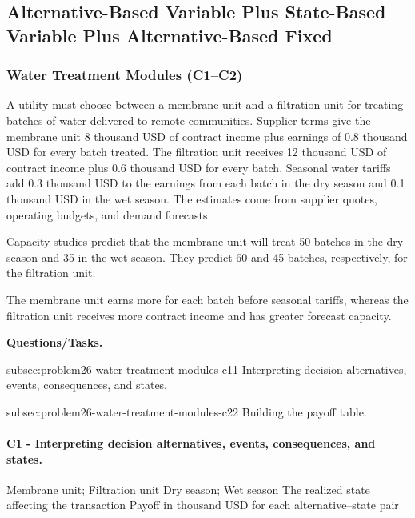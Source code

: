 \subsection{Alternative-Based Variable Plus State-Based Variable Plus Alternative-Based Fixed}
	\label{sec:alternative-based-variable-payoff-plus-state-based-variable-payoff-plus-alternative-based-fixed-payoff}



	\subsubsection{Water Treatment Modules (C1--C2)}
	\label{sec:problem26-water-treatment-modules-c1-c2}
	
	A utility must choose between a membrane unit and a filtration unit for treating batches of water delivered to remote communities. Supplier terms give the membrane unit 8 thousand USD of contract income plus earnings of 0.8 thousand USD for every batch treated. The filtration unit receives 12 thousand USD of contract income plus 0.6 thousand USD for every batch. Seasonal water tariffs add 0.3 thousand USD to the earnings from each batch in the dry season and 0.1 thousand USD in the wet season. The estimates come from supplier quotes, operating budgets, and demand forecasts.
	
	Capacity studies predict that the membrane unit will treat 50 batches in the dry season and 35 in the wet season. They predict 60 and 45 batches, respectively, for the filtration unit.
	
	The membrane unit earns more for each batch before seasonal tariffs, whereas the filtration unit receives more contract income and has greater forecast capacity.

	\textbf{Questions/Tasks.}
	\begin{enumerate}
	\CriterionTask
	{subsec:problem26-water-treatment-modules-c1}{1}
	{Interpreting decision alternatives, events, consequences, and states.}

	\CriterionTask
	{subsec:problem26-water-treatment-modules-c2}{2}
	{Building the payoff table.}
	\end{enumerate}

\paragraph*{C1 - Interpreting decision alternatives, events, consequences, and states.}
	\label{subsec:problem26-water-treatment-modules-c1}
	\DecisionElementsTable
	{Membrane unit; Filtration unit}
	{Dry season; Wet season}
	{The realized state affecting the transaction}
	{Payoff in thousand USD for each alternative--state pair}

